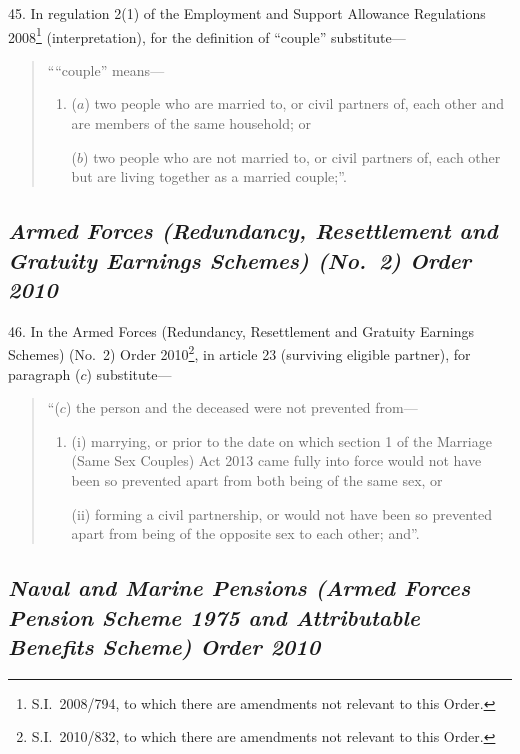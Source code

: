 \documentclass[12pt,a4paper]{article}
\begin{document}
45.  In regulation 2(1) of the Employment and Support Allowance Regulations 2008\footnote{S.I.~2008/794, to which there are amendments not relevant to this Order.} (interpretation), for the definition of “couple” substitute—
\begin{quotation}
““couple” means—
\begin{enumerate}\item[]
($a$) 
two people who are married to, or civil partners of, each other and are members of the same household; or

($b$) 
two people who are not married to, or civil partners of, each other but are living together as a married couple;”.
\end{enumerate}
\end{quotation}

\subsection*{\itshape Armed Forces (Redundancy, Resettlement and Gratuity Earnings Schemes) (No.~2) Order 2010}

46.  In the Armed Forces (Redundancy, Resettlement and Gratuity Earnings Schemes) (No.~2) Order 2010\footnote{S.I.\ 2010/832, to which there are amendments not relevant to this Order.}, in article 23 (surviving eligible partner), for paragraph ($c$)  substitute—
\begin{quotation}
“($c$) the person and the deceased were not prevented from—
\begin{enumerate}\item[]
(i) marrying, or prior to the date on which section 1 of the Marriage (Same Sex Couples) Act 2013 came fully into force would not have been so prevented apart from both being of the same sex, or

(ii) forming a civil partnership, or would not have been so prevented apart from being of the opposite sex to each other; and”.
\end{enumerate}
\end{quotation}

\subsection*{\itshape Naval and Marine Pensions (Armed Forces Pension Scheme 1975 and Attributable Benefits Scheme) Order 2010}
\end{document}
